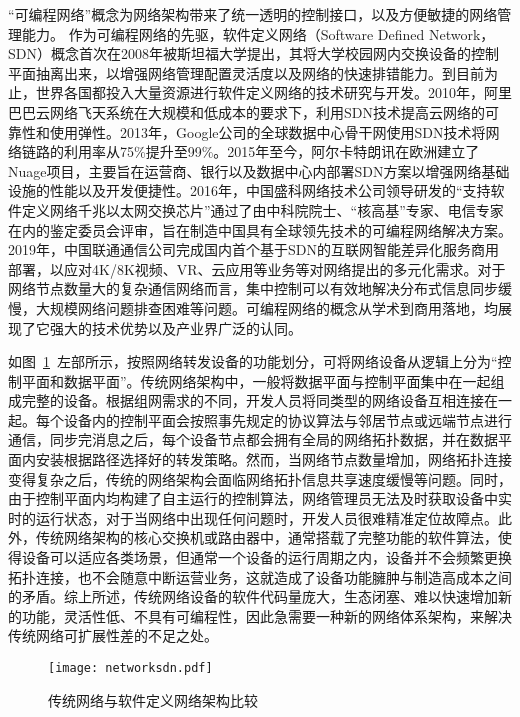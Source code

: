 “可编程网络”概念为网络架构带来了统一透明的控制接口，以及方便敏捷的网络管理能力。
作为可编程网络的先驱，软件定义网络（Software Defined Network，SDN）概念首次在2008年被斯坦福大学提出，其将大学校园网内交换设备的控制平面抽离出来，以增强网络管理配置灵活度以及网络的快速排错能力。到目前为止，世界各国都投入大量资源进行软件定义网络的技术研究与开发。2010年，阿里巴巴云网络飞天系统在大规模和低成本的要求下，利用SDN技术提高云网络的可靠性和使用弹性。2013年，Google公司的全球数据中心骨干网使用SDN技术将网络链路的利用率从75\%提升至99\%。2015年至今，阿尔卡特朗讯在欧洲建立了Nuage\cite{nuagenetworks}项目，主要旨在运营商、银行以及数据中心内部署SDN方案以增强网络基础设施的性能以及开发便捷性。2016年，中国盛科网络技术公司领导研发的“支持软件定义网络千兆以太网交换芯片”通过了由中科院院士、“核高基”专家、电信专家在内的鉴定委员会评审，旨在制造中国具有全球领先技术的可编程网络解决方案。2019年，中国联通通信公司完成国内首个基于SDN的互联网智能差异化服务商用部署，以应对4K/8K视频、VR、云应用等业务等对网络提出的多元化需求。对于网络节点数量大的复杂通信网络而言，集中控制可以有效地解决分布式信息同步缓慢，大规模网络问题排查困难等问题。可编程网络的概念从学术到商用落地，均展现了它强大的技术优势以及产业界广泛的认同。


\label{chap112}


如图~\ref{fig:networksdn}~左部所示，按照网络转发设备的功能划分，可将网络设备从逻辑上分为“控制平面和数据平面”。传统网络架构中，一般将数据平面与控制平面集中在一起组成完整的设备。根据组网需求的不同，开发人员将同类型的网络设备互相连接在一起。每个设备内的控制平面会按照事先规定的协议算法与邻居节点或远端节点进行通信，同步完消息之后，每个设备节点都会拥有全局的网络拓扑数据，并在数据平面内安装根据路径选择好的转发策略。然而，当网络节点数量增加，网络拓扑连接变得复杂之后，传统的网络架构会面临网络拓扑信息共享速度缓慢等问题。同时，由于控制平面内均构建了自主运行的控制算法，网络管理员无法及时获取设备中实时的运行状态，对于当网络中出现任何问题时，开发人员很难精准定位故障点。此外，传统网络架构的核心交换机或路由器中，通常搭载了完整功能的软件算法，使得设备可以适应各类场景，但通常一个设备的运行周期之内，设备并不会频繁更换拓扑连接，也不会随意中断运营业务，这就造成了设备功能臃肿与制造高成本之间的矛盾。综上所述，传统网络设备的软件代码量庞大，生态闭塞、难以快速增加新的功能，灵活性低、不具有可编程性，因此急需要一种新的网络体系架构，来解决传统网络可扩展性差的不足之处。

\begin{figure}[!ht]
	\centering 
	\vspace{-1.5mm} 
	\texttt{[image: networksdn.pdf]}
	\caption{传统网络与软件定义网络架构比较} \label{fig:networksdn}
\end{figure}

